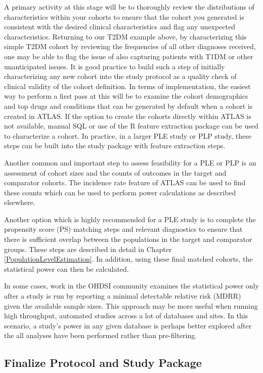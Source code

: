 \documentclass[11pt]{book}
\theoremstyle{definition}
\theoremstyle{definition}
\theoremstyle{definition}
\theoremstyle{remark}
\begin{document}
A primary activity at this stage will be to thoroughly review the
distributions of characteristics within your cohorts to ensure that the
cohort you generated is consistent with the desired clinical
characteristics and flag any unexpected characteristics. Returning to
our T2DM example above, by characterizing this simple T2DM cohort by
reviewing the frequencies of all other diagnoses received, one may be
able to flag the issue of also capturing patients with T1DM or other
unanticipated issues. It is good practice to build such a step of
initially characterizing any new cohort into the study protocol as a
quality check of clinical validity of the cohort definition. In terms of
implementation, the easiest way to perform a first pass at this will be
to examine the cohort demographics and top drugs and conditions that can
be generated by default when a cohort is created in ATLAS. If the option
to create the cohorts directly within ATLAS is not available, manual SQL
or use of the R feature extraction package can be used to characterize a
cohort. In practice, in a larger PLE study or PLP study, these steps can
be built into the study package with feature extraction steps.

Another common and important step to assess feasibility for a PLE or PLP
is an assessment of cohort sizes and the counts of outcomes in the
target and comparator cohorts. The incidence rate feature of ATLAS can
be used to find these counts which can be used to perform power
calculations as described elsewhere.

Another option which is highly recommended for a PLE study is to
complete the propensity score (PS) matching steps and relevant
diagnostics to ensure that there is sufficient overlap between the
populations in the target and comparator groups. These steps are
described in detail in Chapter \ref{PopulationLevelEstimation}. In
addition, using these final matched cohorts, the statistical power can
then be calculated.

In some cases, work in the OHDSI community examines the statistical
power only after a study is run by reporting a minimal detectable
relative risk (MDRR) given the available sample sizes. This approach may
be more useful when running high throughput, automated studies across a
lot of databases and sites. In this scenario, a study's power in any
given database is perhaps better explored after the all analyses have
been performed rather than pre-filtering.

\subsection{Finalize Protocol and Study
Package}\label{finalize-protocol-and-study-package}
\end{document}
